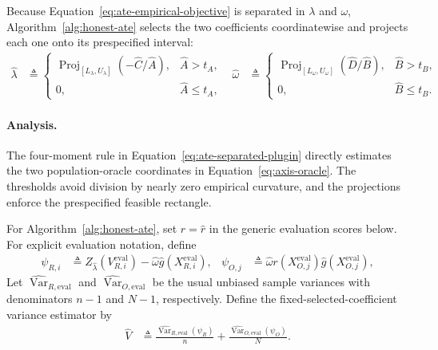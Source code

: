 Because Equation~\eqref{eq:ate-empirical-objective} is separated in $\lambda$ and $\omega$, Algorithm~\ref{alg:honest-ate} selects the two coefficients coordinatewise and projects each one onto its prespecified interval:
\begin{align}
\widehat\lambda
&\triangleq
\begin{cases}
\operatorname{Proj}_{[L_\lambda,U_\lambda]}(-\widehat C/\widehat A),&\widehat A>t_A,\\
0,&\widehat A\leq t_A,
\end{cases}
&
\widehat\omega
&\triangleq
\begin{cases}
\operatorname{Proj}_{[L_\omega,U_\omega]}(\widehat D/\widehat B),&\widehat B>t_B,\\
0,&\widehat B\leq t_B.
\end{cases}
\label{eq:ate-separated-plugin}
\end{align}

\paragraph{Analysis.}

The four-moment rule in Equation~\eqref{eq:ate-separated-plugin} directly estimates the two population-oracle coordinates in Equation~\eqref{eq:axis-oracle}. The thresholds avoid division by nearly zero empirical curvature, and the projections enforce the prespecified feasible rectangle.


For Algorithm~\ref{alg:honest-ate}, set $r=\widehat r$ in the generic evaluation scores below.  For explicit evaluation notation, define
\begin{align*}
	\psi_{R,i}
	&\triangleq
	Z_{\widehat\lambda}(V_{R,i}^{\mathrm{eval}})-\widehat\omega \widehat{g}(X_{R,i}^{\mathrm{eval}}),
	&
	\psi_{O,j}
	&\triangleq
	\widehat\omega r(X_{O,j}^{\mathrm{eval}})\widehat{g}(X_{O,j}^{\mathrm{eval}}),
\end{align*}
Let $\widehat{\operatorname{Var}}_{R,\mathrm{eval}}$ and $\widehat{\operatorname{Var}}_{O,\mathrm{eval}}$ be the usual unbiased sample variances with denominators $n-1$ and $N-1$, respectively. Define the fixed-selected-coefficient variance estimator by
\begin{align}\label{eq:ate-evaluation-variance}
	\widehat V &\triangleq
	\frac{\widehat{\operatorname{Var}}_{R,\mathrm{eval}}(\psi_R)}{n}
	+
	\frac{\widehat{\operatorname{Var}}_{O,\mathrm{eval}}(\psi_O)}{N}.
\end{align}

